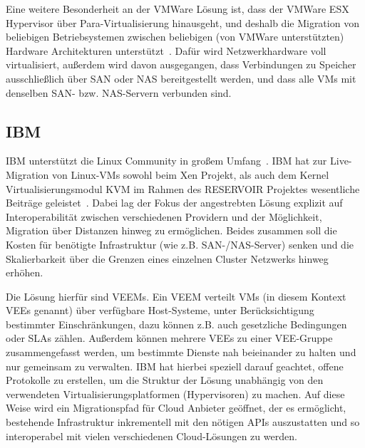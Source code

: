 Eine weitere Besonderheit an der VMWare Lösung ist, dass der VMWare
ESX Hypervisor über Para-Virtualisierung hinausgeht, und deshalb die
Migration von beliebigen Betriebsystemen zwischen beliebigen (von
VMWare unterstützten) Hardware Architekturen
unterstützt~\cite{nelson2005fast}. Dafür wird Netzwerkhardware voll
virtualisiert, außerdem wird davon ausgegangen, dass Verbindungen zu
Speicher ausschließlich über \ac{SAN} oder \ac{NAS} bereitgestellt
werden, und dass alle \acp{VM} mit denselben \ac{SAN}-
bzw. \ac{NAS}-Servern verbunden sind.

\subsection{IBM}
IBM unterstützt die Linux Community in großem
Umfang~\cite{kroahhartman2007linux}. IBM hat zur Live-Migration von
Linux-\acp{VM} sowohl beim Xen Projekt, als auch dem Kernel
Virtualisierungsmodul \ac{KVM} im Rahmen des RESERVOIR Projektes
wesentliche Beiträge geleistet~\cite{rochwerger2009reservoir}. Dabei
lag der Fokus der angestrebten Lösung explizit auf Interoperabilität
zwischen verschiedenen Providern und der Möglichkeit, Migration über
Distanzen hinweg zu ermöglichen. Beides zusammen soll die Kosten für
benötigte Infrastruktur (wie z.B. \ac{SAN}-/\ac{NAS}-Server) senken
und die Skalierbarkeit über die Grenzen eines einzelnen Cluster
Netzwerks hinweg erhöhen.

Die Lösung hierfür sind \acp{VEEM}. Ein \ac{VEEM} verteilt \acp{VM}
(in diesem Kontext \acp{VEE} genannt) über verfügbare Host-Systeme,
unter Berücksichtigung bestimmter Einschränkungen, dazu können
z.B. auch gesetzliche Bedingungen oder \acp{SLA} zählen. Außerdem
können mehrere \acp{VEE} zu einer \ac{VEE}-Gruppe zusammengefasst
werden, um bestimmte Dienste nah beieinander zu halten und nur
gemeinsam zu verwalten. IBM hat hierbei speziell darauf geachtet,
offene Protokolle zu erstellen, um die Struktur der Lösung unabhängig
von den verwendeten Virtualisierungsplatformen (\zB Hypervisoren) zu
machen. Auf diese Weise wird ein Migrationspfad für Cloud Anbieter
geöffnet, der es ermöglicht, bestehende Infrastruktur inkrementell mit
den nötigen \acp{API} auszustatten und so interoperabel mit vielen
verschiedenen Cloud-Lösungen zu werden.

